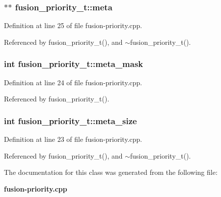 \subsubsection[{meta}]{$\ast$$\ast$ {\bf fusion\_\-priority\_\-t::meta}\hspace{0.3cm}{\tt  [protected]}}\label{classfusion__priority__t_6d92612cb988f93bb851acfb909fb801}




Definition at line 25 of file fusion-priority.cpp.

Referenced by fusion\_\-priority\_\-t(), and $\sim$fusion\_\-priority\_\-t().
\subsubsection[{meta\_\-mask}]{\setlength{\rightskip}{0pt plus 5cm}int {\bf fusion\_\-priority\_\-t::meta\_\-mask}\hspace{0.3cm}{\tt  [protected]}}\label{classfusion__priority__t_77447d794e9d080fc7b98224227f8d7a}




Definition at line 24 of file fusion-priority.cpp.

Referenced by fusion\_\-priority\_\-t().
\subsubsection[{meta\_\-size}]{\setlength{\rightskip}{0pt plus 5cm}int {\bf fusion\_\-priority\_\-t::meta\_\-size}\hspace{0.3cm}{\tt  [protected]}}\label{classfusion__priority__t_19ba06f36554c8e37e18d7903b5e8746}




Definition at line 23 of file fusion-priority.cpp.

Referenced by fusion\_\-priority\_\-t(), and $\sim$fusion\_\-priority\_\-t().

The documentation for this class was generated from the following file:\begin{CompactItemize}
\item 
{\bf fusion-priority.cpp}\end{CompactItemize}
